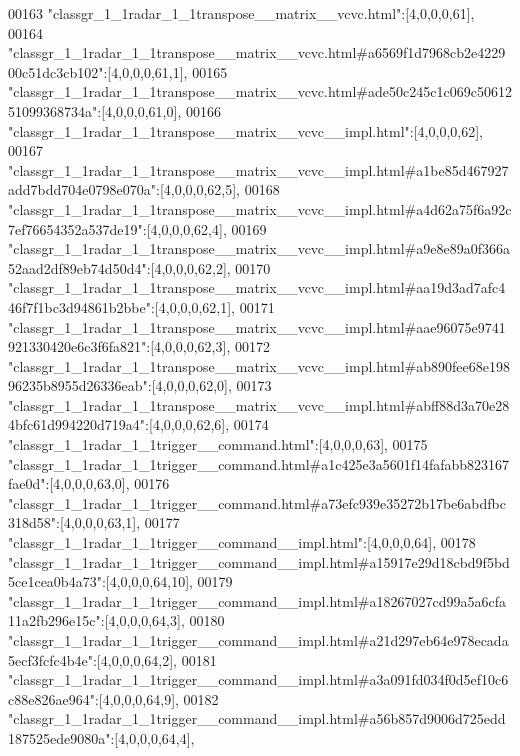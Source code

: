 \begin{DoxyCode}
00163 \textcolor{stringliteral}{"classgr\_1\_1radar\_1\_1transpose\_\_matrix\_\_vcvc.html"}:[4,0,0,0,61],
00164 \textcolor{stringliteral}{"classgr\_1\_1radar\_1\_1transpose\_\_matrix\_\_vcvc.html#a6569f1d7968cb2e422900c51dc3cb102"}:[4,0,0,0,61,1],
00165 \textcolor{stringliteral}{"classgr\_1\_1radar\_1\_1transpose\_\_matrix\_\_vcvc.html#ade50c245c1c069c5061251099368734a"}:[4,0,0,0,61,0],
00166 \textcolor{stringliteral}{"classgr\_1\_1radar\_1\_1transpose\_\_matrix\_\_vcvc\_\_impl.html"}:[4,0,0,0,62],
00167 \textcolor{stringliteral}{"classgr\_1\_1radar\_1\_1transpose\_\_matrix\_\_vcvc\_\_impl.html#a1be85d467927add7bdd704e0798e070a"}:[4,0,0,0,62,5],
00168 \textcolor{stringliteral}{"classgr\_1\_1radar\_1\_1transpose\_\_matrix\_\_vcvc\_\_impl.html#a4d62a75f6a92c7ef76654352a537de19"}:[4,0,0,0,62,4],
00169 \textcolor{stringliteral}{"classgr\_1\_1radar\_1\_1transpose\_\_matrix\_\_vcvc\_\_impl.html#a9e8e89a0f366a52aad2df89eb74d50d4"}:[4,0,0,0,62,2],
00170 \textcolor{stringliteral}{"classgr\_1\_1radar\_1\_1transpose\_\_matrix\_\_vcvc\_\_impl.html#aa19d3ad7afc446f7f1bc3d94861b2bbe"}:[4,0,0,0,62,1],
00171 \textcolor{stringliteral}{"classgr\_1\_1radar\_1\_1transpose\_\_matrix\_\_vcvc\_\_impl.html#aae96075e9741921330420e6c3f6fa821"}:[4,0,0,0,62,3],
00172 \textcolor{stringliteral}{"classgr\_1\_1radar\_1\_1transpose\_\_matrix\_\_vcvc\_\_impl.html#ab890fee68e19896235b8955d26336eab"}:[4,0,0,0,62,0],
00173 \textcolor{stringliteral}{"classgr\_1\_1radar\_1\_1transpose\_\_matrix\_\_vcvc\_\_impl.html#abff88d3a70e284bfc61d994220d719a4"}:[4,0,0,0,62,6],
00174 \textcolor{stringliteral}{"classgr\_1\_1radar\_1\_1trigger\_\_command.html"}:[4,0,0,0,63],
00175 \textcolor{stringliteral}{"classgr\_1\_1radar\_1\_1trigger\_\_command.html#a1c425e3a5601f14fafabb823167fae0d"}:[4,0,0,0,63,0],
00176 \textcolor{stringliteral}{"classgr\_1\_1radar\_1\_1trigger\_\_command.html#a73efc939e35272b17be6abdfbc318d58"}:[4,0,0,0,63,1],
00177 \textcolor{stringliteral}{"classgr\_1\_1radar\_1\_1trigger\_\_command\_\_impl.html"}:[4,0,0,0,64],
00178 \textcolor{stringliteral}{"classgr\_1\_1radar\_1\_1trigger\_\_command\_\_impl.html#a15917e29d18cbd9f5bd5ce1cea0b4a73"}:[4,0,0,0,64,10],
00179 \textcolor{stringliteral}{"classgr\_1\_1radar\_1\_1trigger\_\_command\_\_impl.html#a18267027cd99a5a6cfa11a2fb296e15c"}:[4,0,0,0,64,3],
00180 \textcolor{stringliteral}{"classgr\_1\_1radar\_1\_1trigger\_\_command\_\_impl.html#a21d297eb64e978ecada5ecf3fcfc4b4e"}:[4,0,0,0,64,2],
00181 \textcolor{stringliteral}{"classgr\_1\_1radar\_1\_1trigger\_\_command\_\_impl.html#a3a091fd034f0d5ef10c6c88e826ae964"}:[4,0,0,0,64,9],
00182 \textcolor{stringliteral}{"classgr\_1\_1radar\_1\_1trigger\_\_command\_\_impl.html#a56b857d9006d725edd187525ede9080a"}:[4,0,0,0,64,4],

\end{DoxyCode}

